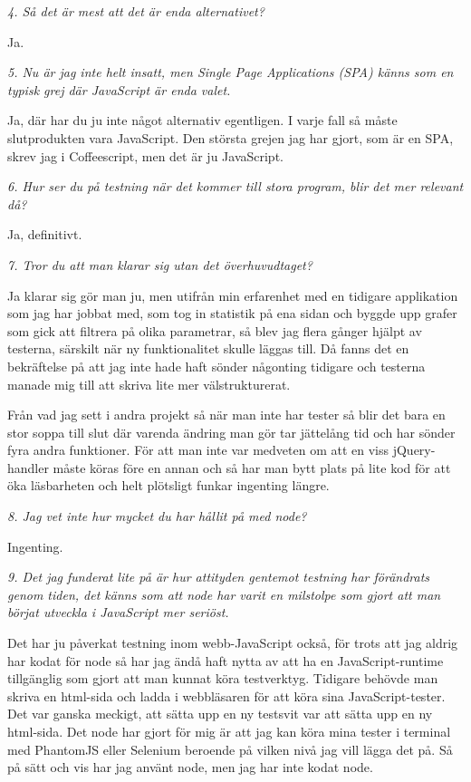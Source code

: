 \documentclass[11pt]{article}
\begin{document}
\emph{4. Så det är mest att det är enda alternativet?}

Ja.

\emph{5. Nu är jag inte helt insatt, men Single Page Applications (SPA) känns som en typisk grej där JavaScript är enda valet.}

Ja, där har du ju inte något alternativ egentligen. I varje fall så måste slutprodukten vara JavaScript. Den största grejen jag har gjort, som är en SPA, skrev jag i Coffeescript, men det är ju JavaScript.

\emph{6. Hur ser du på testning när det kommer till stora program, blir det mer relevant då?}

Ja, definitivt.

\emph{7. Tror du att man klarar sig utan det överhuvudtaget?}

Ja klarar sig gör man ju, men utifrån min erfarenhet med en tidigare applikation som jag har jobbat med, som tog in statistik på ena sidan och byggde upp grafer som gick att filtrera på olika parametrar, så blev jag flera gånger hjälpt av testerna, särskilt när ny funktionalitet skulle läggas till. Då fanns det en bekräftelse på att jag inte hade haft sönder någonting tidigare och testerna manade mig till att skriva lite mer välstrukturerat.

Från vad jag sett i andra projekt så när man inte har tester så blir det bara en stor soppa till slut där varenda ändring man gör tar jättelång tid och har sönder fyra andra funktioner. För att man inte var medveten om att en viss jQuery-handler måste köras före en annan och så har man bytt plats på lite kod för att öka läsbarheten och helt plötsligt funkar ingenting längre.

\emph{8. Jag vet inte hur mycket du har hållit på med node?}

Ingenting.

\emph{9. Det jag funderat lite på är hur attityden gentemot testning har förändrats genom tiden, det känns som att node har varit en milstolpe som gjort att man börjat utveckla i JavaScript mer seriöst.}

Det har ju påverkat testning inom webb-JavaScript också, för trots att jag aldrig har kodat för node så har jag ändå haft nytta av att ha en JavaScript-runtime tillgänglig som gjort att man kunnat köra testverktyg. Tidigare behövde man skriva en html-sida och ladda i webbläsaren för att köra sina JavaScript-tester. Det var ganska meckigt, att sätta upp en ny testsvit var att sätta upp en ny html-sida. Det node har gjort för mig är att jag kan köra mina tester i terminal med PhantomJS eller Selenium beroende på vilken nivå jag vill lägga det på. Så på sätt och vis har jag använt node, men jag har inte kodat node.
\end{document}
